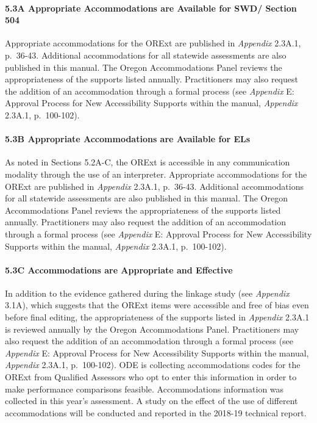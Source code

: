 \documentclass[]{article}
\let\oldparagraph\paragraph
\renewcommand{\paragraph}[1]{\oldparagraph{#1}\mbox{}}
\begin{document}
\hypertarget{a-appropriate-accommodations-are-available-for-swd-section-504}{%
\paragraph{5.3A Appropriate Accommodations are Available for SWD/
Section
504}\label{a-appropriate-accommodations-are-available-for-swd-section-504}}

Appropriate accommodations for the ORExt are published in
\emph{Appendix} 2.3A.1, p.~36-43. Additional accommodations for all
statewide assessments are also published in this manual. The Oregon
Accommodations Panel reviews the appropriateness of the supports listed
annually. Practitioners may also request the addition of an
accommodation through a formal process (see \emph{Appendix} E: Approval
Process for New Accessibility Supports within the manual,
\emph{Appendix} 2.3A.1, p.~100-102).

\hypertarget{b-appropriate-accommodations-are-available-for-els}{%
\paragraph{5.3B Appropriate Accommodations are Available for
ELs}\label{b-appropriate-accommodations-are-available-for-els}}

As noted in Sections 5.2A-C, the ORExt is accessible in any
communication modality through the use of an interpreter. Appropriate
accommodations for the ORExt are published in \emph{Appendix} 2.3A.1,
p.~36-43. Additional accommodations for all statewide assessments are
also published in this manual. The Oregon Accommodations Panel reviews
the appropriateness of the supports listed annually. Practitioners may
also request the addition of an accommodation through a formal process
(see \emph{Appendix} E: Approval Process for New Accessibility Supports
within the manual, \emph{Appendix} 2.3A.1, p.~100-102).

\hypertarget{c-accommodations-are-appropriate-and-effective}{%
\paragraph{5.3C Accommodations are Appropriate and
Effective}\label{c-accommodations-are-appropriate-and-effective}}

In addition to the evidence gathered during the linkage study (see
\emph{Appendix} 3.1A), which suggests that the ORExt items were
accessible and free of bias even before final editing, the
appropriateness of the supports listed in \emph{Appendix} 2.3A.1 is
reviewed annually by the Oregon Accommodations Panel. Practitioners may
also request the addition of an accommodation through a formal process
(see \emph{Appendix} E: Approval Process for New Accessibility Supports
within the manual, \emph{Appendix} 2.3A.1, p.~100-102). ODE is
collecting accommodations codes for the ORExt from Qualified Assessors
who opt to enter this information in order to make performance
comparisons feasible. Accommodations information was collected in this
year's assessment. A study on the effect of the use of different
accommodations will be conducted and reported in the 2018-19 technical
report.
\end{document}
